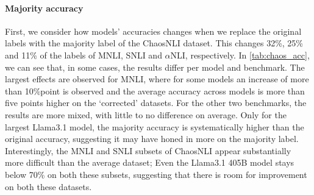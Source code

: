 \paragraph{Majority accuracy}
First, we consider how models' accuracies changes when we replace the original labels with the majority label of the ChaosNLI dataset.
This changes 32\%, 25\% and 11\% of the labels of MNLI, SNLI and $\alpha$NLI, respectively.
In \cref{tab:chaos_acc}, we can see that, in some cases, the results differ per model and benchmark.
The largest effects are observed for MNLI, where for some models an increase of more than 10\%point is observed and the average accuracy across models is more than five points higher on the `corrected' datasets.
For the other two benchmarks, the results are more mixed, with little to no difference on average.
Only for the largest Llama3.1 model, the majority accuracy is systematically higher than the original accuracy, suggesting it may have honed in more on the majority label.
Interestingly, the MNLI and SNLI subsets of ChaosNLI appear substantially more difficult than the average dataset;
Even the Llama3.1 405B model stays below 70\% on both these subsets, suggesting that there is room for improvement on both these datasets.

